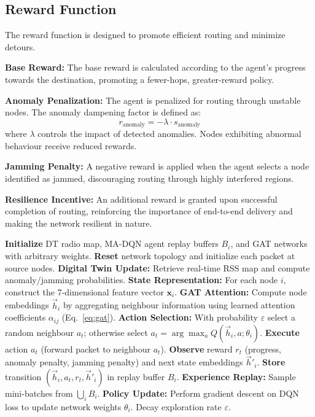 \documentclass[conference]{IEEEtran}
\begin{document}
\subsection{Reward Function}
\label{sec:reward}

The reward function is designed to promote efficient routing and minimize detours.

\textbf{Base Reward:}
The base reward is calculated according to the agent's progress towards the destination, promoting a fewer-hops, greater-reward policy.

\textbf{Anomaly Penalization:}
The agent is penalized for routing through unstable nodes. The anomaly dampening factor is defined as:
\begin{equation}
  r_{\text{anomaly}} = -\lambda \cdot s_{\text{anomaly}}
  \label{eq:anomaly}
\end{equation}
where $\lambda$ controls the impact of detected anomalies. Nodes exhibiting abnormal behaviour receive reduced rewards.

\textbf{Jamming Penalty:}
A negative reward is applied when the agent selects a node identified as jammed, discouraging routing through highly interfered regions.

\textbf{Resilience Incentive:}
An additional reward is granted upon successful completion of routing, reinforcing the importance of end-to-end delivery and making the network resilient in nature.

\begin{algorithm}[htbp]
\caption{Resilient Routing with MA DT-GCN}
\label{alg:madtgcn}
\begin{algorithmic}[1]
\STATE \textbf{Initialize} DT radio map, MA-DQN agent replay buffers $B_i$, and GAT networks with arbitrary weights.
    \STATE \textbf{Reset} network topology and initialize each packet at source nodes.
        \STATE \textbf{Digital Twin Update:} Retrieve real-time RSS map and compute anomaly/jamming probabilities.
        \STATE \textbf{State Representation:} For each node $i$, construct the 7-dimensional feature vector $\mathbf{x}_i$.
        \STATE \textbf{GAT Attention:} Compute node embeddings $\vec{h}_i$ by aggregating neighbour information using learned attention coefficients $\alpha_{ij}$ (Eq.~\ref{eq:gat}).
            \STATE \textbf{Action Selection:} With probability $\varepsilon$ select a random neighbour $a_t$; otherwise select $a_t = \arg\max_{a} Q(\vec{h}_i, a; \theta_i)$.
            \STATE \textbf{Execute} action $a_t$ (forward packet to neighbour $a_t$).
            \STATE \textbf{Observe} reward $r_t$ (progress, anomaly penalty, jamming penalty) and next state embeddings $\vec{h}'_i$.
            \STATE \textbf{Store} transition $(\vec{h}_i, a_t, r_t, \vec{h}'_i)$ in replay buffer $B_i$.
        \ENDFOR
        \STATE \textbf{Experience Replay:} Sample mini-batches from $\bigcup_i B_i$.
        \STATE \textbf{Policy Update:} Perform gradient descent on DQN loss to update network weights $\theta_i$.
    \ENDWHILE
    \STATE Decay exploration rate $\varepsilon$.
\ENDFOR
\end{algorithmic}
\end{algorithm}
\end{document}
